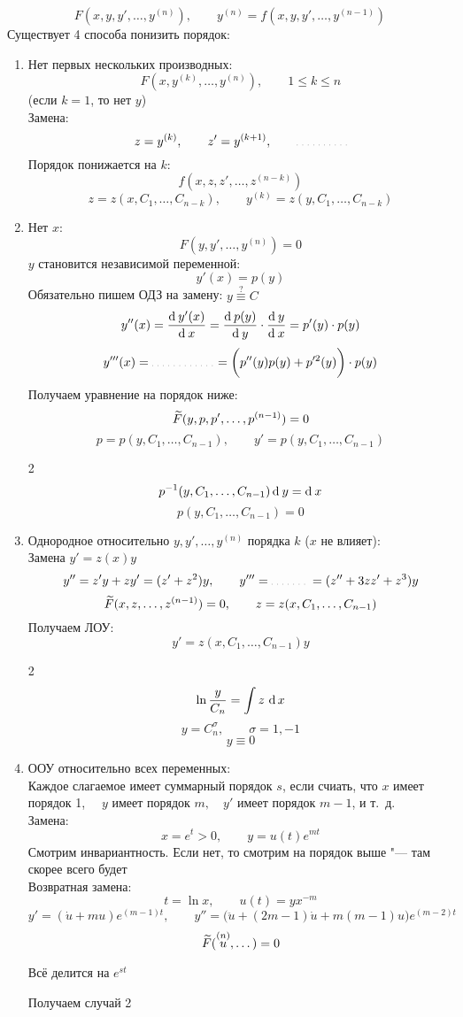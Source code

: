 $$ F(x, y, y', \dots, y^{(n)}), \qquad y^{(n)} = f(x, y, y', \dots, y^{(n - 1)}) $$
Существует 4 способа понизить порядок:
\begin{enumerate}
	\item Нет первых нескольких производных:
    $$ F(x, y^{(k)}, \dots, y^{(n)}), \qquad 1 \le k \le n $$
    (если $ k = 1$, то нет $ y $) \\
    Замена:
    $$ z = y^{(k)}, \qquad z' = y^{(k + 1)}, \qquad \widedots[4em] $$
    Порядок понижается на $ k $:
    $$ f(x, z, z', \dots, z^{(n - k)}) $$
    $$ z = z(x, C_1, \dots, C_{n - k}), \qquad y^{(k)} = z(y, C_1, \dots, C_{n - k}) $$
    \item Нет $ x $:
    $$ F(y, y', \dots, y^{(n)}) = 0 $$
    $ y $ становится независимой переменной:
    $$ y'(x) = p(y) $$
    Обязательно пишем ОДЗ на замену: $ y \stackrel?\equiv C $ \\
    $$ y''(x) = \frac{\operatorname{d}^{} y'(x)}{\operatorname{d}^{} x} = \frac{\operatorname{d}^{} p(y)}{\operatorname{d}^{} y} \cdot \frac{\operatorname{d}^{} y}{\operatorname{d}^{} x}= p'(y) \cdot p(y) $$
    $$ y'''(x) = \widedots[5em] = \bigg( p''(y)p(y) + p'^2(y) \bigg) \cdot p(y) $$
    Получаем уравнение на порядок ниже:
    $$ \widetilde F(y, p, p', \dots, p^{(n - 1)}) = 0 $$
    $$ p = p(y, C_1, \dots, C_{n - 1}), \qquad y' = p(y, C_1, \dots, C_{n - 1}) $$
    \antlersimp
    \begin{multicols}2
        $$ p^{-1}(y, C_1, \dots, C_{n - 1})\operatorname{d}^{} y = \operatorname{d}^{} x $$
        \columnbreak
        $$ p(y, C_1, \dots, C_{n - 1}) = 0 $$
    \end{multicols}
    \item Однородное относительно $ y, y', \dots, y^{(n)} $ порядка $ k $ ($ x $ не влияет): \\
    Замена $ y' = z(x)y $
    $$ y'' = z'y + zy' = (z' + z^2)y, \qquad y''' = \widedots[3em] = (z'' + 3zz' + z^3)y $$
    $$ \widetilde F(x, z, \dots, z^{(n - 1)}) = 0, \qquad z = z(x, C_1, \dots, C_{n - 1}) $$
    Получаем ЛОУ:
    $$ y' = z(x, C_1, \dots, C_{n - 1})y $$
    \antlersimp
    \begin{multicols}2
        $$ \ln \frac{y}{C_n} = \int {z} \, \operatorname{d} {x} $$
        $$ y = C_n^\sigma, \qquad \sigma = 1, -1 $$
        \columnbreak
        $$ y \equiv 0 $$
    \end{multicols}
    \item ООУ относительно всех переменных: \\
    Каждое слагаемое имеет суммарный порядок $ s $, если счиать, что $ x $ имеет порядок 1, $ \quad y $ имеет порядок $ m, \quad y' $ имеет порядок $ m - 1 $, и т.~д. \\
    Замена:
    $$ x = e^t > 0, \qquad y = u(t)e^{mt} $$
    Смотрим инвариантность. Если нет, то смотрим на порядок выше "--- там скорее всего будет \\
    Возвратная замена:
    $$ t = \ln x, \qquad u(t) = yx^{-m} $$
    $$ y' = (\dot{u} + mu)e^{(m - 1)t}, \qquad y'' = \bigg( \ddot u + (2m - 1)\dot u + m(m - 1)u \bigg)e^{(m - 2)t} $$
    $$ \widetilde F(\overset{(n)}u, \dots) = 0 $$
    \begin{control}
        Всё делится на $ e^{st} $
    \end{control}
    Получаем случай 2
\end{enumerate}
